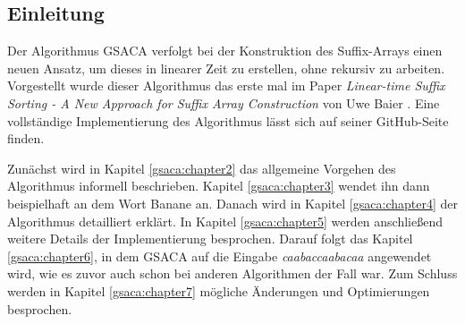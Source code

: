 \subsection{Einleitung}
\label{gsaca:chapter1}
%
Der  Algorithmus GSACA verfolgt bei der Konstruktion des Suffix-Arrays einen neuen Ansatz, um dieses in linearer Zeit zu erstellen, ohne rekursiv zu arbeiten.
Vorgestellt wurde dieser Algorithmus das erste mal im Paper \textit{Linear-time Suffix Sorting - A New Approach for Suffix Array Construction} von Uwe Baier \cite{saca:3}. 
Eine vollständige Implementierung des Algorithmus lässt sich auf seiner GitHub-Seite \cite{saca:3:github} finden. \par
Zunächst wird in Kapitel \ref{gsaca:chapter2} das allgemeine Vorgehen des Algorithmus informell beschrieben. 
Kapitel \ref{gsaca:chapter3} wendet ihn dann beispielhaft an dem Wort Banane an. 
Danach wird in Kapitel \ref{gsaca:chapter4} der Algorithmus detailliert erklärt. 
In Kapitel \ref{gsaca:chapter5} werden anschließend weitere Details der Implementierung besprochen.
Darauf folgt das Kapitel \ref{gsaca:chapter6}, in dem GSACA auf die Eingabe \textit{caabaccaabacaa} angewendet wird, wie es zuvor auch schon bei anderen Algorithmen der Fall war.
Zum Schluss werden in Kapitel \ref{gsaca:chapter7} mögliche Änderungen und Optimierungen besprochen. 
